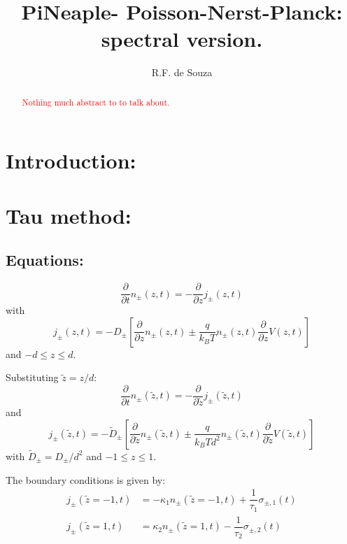 \documentclass[amsmath,amsfonts,amssymb,superscriptaddress,showkeys,notitlepage,onecolumn]{revtex4-1}
\newcommand{\tred}[1]{ \textcolor{red}{#1} }
\newcommand{\dpartial}[1]{\ensuremath{\dfrac{\partial}{\partial #1}}}
\newcommand{\Npm}{\ensuremath{n_{\pm}(z,t)}}
\newcommand{\jpm}{\ensuremath{j_{\pm}(z,t)}}
\begin{document}
\title{PiNeaple- Poisson-Nerst-Planck: spectral version.}

\author{R.F. de Souza}

\begin{abstract} \tred{ Nothing much abstract to to talk about.} 
\end{abstract}

\maketitle

\section{Introduction:}



\section{Tau method:}

\subsection{Equations:}
\begin{equation}
  \dfrac{\partial}{\partial t}\Npm= -\dpartial{z} \jpm
\end{equation}
with
\begin{equation}\label{eq:StrongFlux}
  j_{\pm}(z,t)=-D_{\pm}\left[\dpartial{z} \Npm \pm \dfrac{q}{k_B T} \Npm \dpartial{z} V(z,t) \right] 
\end{equation}
and $-d \leq z \leq d$.

  \renewcommand{\Npm}{\ensuremath{n_{\pm}(\tilde{z},t)}}
  \renewcommand{\jpm}{\ensuremath{j_{\pm}(\tilde{z},t)}}

  
  Substituting $\tilde{z}=z/d$:
  \begin{equation}\label{eq:StrongPotential}
  \dfrac{\partial}{\partial t}\Npm= -\dpartial{\tilde{z}} \jpm
\end{equation}
and  
\begin{equation}
  \jpm=-\tilde{D}_\pm\left[\dpartial{\tilde{z}}\Npm \pm \dfrac{q}{k_B T d^2} \Npm \dpartial{\tilde{z}} V(\tilde{z},t) \right]
\end{equation}
with $\tilde{D}_\pm =D_\pm/d^2$ and $-1\leq z \leq 1$.

The boundary conditions is given by:
\begin{align}\nonumber
  j_{\pm}(\tilde{z}=-1,t)&=-\kappa_1 n_{\pm}(\tilde{z}=-1,t) + \dfrac{1}{\tau_1}\sigma_{\pm,1}(t)\\
  j_{\pm}(\tilde{z}=1,t)&=\kappa_2 n_{\pm}(\tilde{z}=1,t) -\dfrac{1}{\tau_2}\sigma_{\pm,2}(t)
\end{align}
\end{document}
